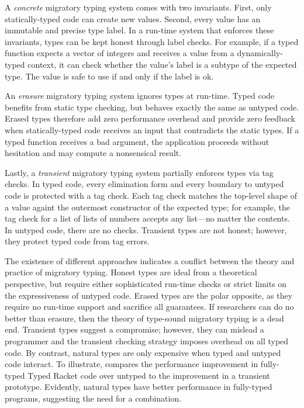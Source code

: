 A \emph{concrete}\/ migratory typing system comes with two invariants.
First, only statically-typed code can create new values.
Second, every value has an immutable and precise type label.
In a run-time system that enforces these invariants, types can be kept honest
 through label checks.
For example, if a typed function expects a vector of integers and receives
 a value from a dynamically-typed context, it can check whether the value's
 label is a subtype of the expected type.
The value is safe to use if and only if the label is ok.

An \emph{erasure}\/ migratory typing system ignores types at run-time.
Typed code benefits from static type checking, but behaves exactly the same
 as untyped code.
Erased types therefore add zero performance overhead and provide zero feedback
 when statically-typed code receives an input that contradicts the static
 types.
If a typed function receives a bad argument, the application proceeds without
 hesitation and may compute a nonsensical result.

Lastly, a \emph{transient}\/ migratory typing system partially enforces types
 via tag checks.
In typed code, every elimination form and every boundary to untyped code
 is protected with a tag check.
Each tag check matches the top-level shape of a value againt the outermost
 constructor of the expected type; for example, the tag check for a
 list of lists of numbers accepts any list---no matter the contents.
In untyped code, there are no checks.
Transient types are not honest; however, they protect typed code from tag
 errors.

The existence of different approaches indicates a conflict between the theory
 and practice of migratory typing.
Honest types are ideal from a theoretical perspective, but require either
 sophisticated run-time checks or strict limits on the expressiveness of
 untyped code.
Erased types are the polar opposite, as they require no run-time support
 and sacrifice all guarantees.
If researchers can do no better than erasure, then the theory of
 type-sound migratory typing is a dead end.
Transient types suggest a compromise; however, they can mislead a programmer
 and the transient checking strategy imposes overhead on all typed code.
By contrast, natural types are only expensive when typed and untyped code interact.
To illustrate,  compares the performance improvement
 in fully-typed Typed Racket code over untyped to the improvement in a
 transient prototype.
Evidently, natural types have better performance in fully-typed programs,
 suggesting the need for a combination.

